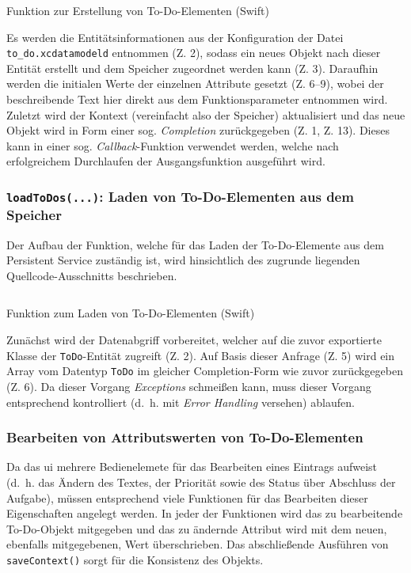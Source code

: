 \begin{listing}[H]
	\inputminted{Swift}{sourcecode/ios_createToDo.swift}	
	\caption{Funktion zur Erstellung von To-Do-Elementen (Swift)}
\end{listing}

Es werden die Entitätsinformationen aus der Konfiguration der Datei \texttt{to\_do.xcdatamodeld} entnommen (Z. 2), sodass ein neues Objekt nach dieser Entität erstellt und dem Speicher zugeordnet werden kann (Z. 3). Daraufhin werden die initialen Werte der einzelnen Attribute gesetzt (Z. 6--9), wobei der beschreibende Text hier direkt aus dem Funktionsparameter entnommen wird. Zuletzt wird der Kontext (vereinfacht also der Speicher) aktualisiert und das neue Objekt wird in Form einer sog. \textit{Completion} zurückgegeben (Z. 1, Z. 13). Dieses kann in einer sog. \textit{Callback}-Funktion verwendet werden, welche nach erfolgreichem Durchlaufen der Ausgangsfunktion ausgeführt wird.

\subsubsection{\texttt{loadToDos(...)}: Laden von To-Do-Elementen aus dem Speicher}
Der Aufbau der Funktion, welche für das Laden der To-Do-Elemente aus dem Persistent Service zuständig ist, wird hinsichtlich des zugrunde liegenden Quellcode-Ausschnitts beschrieben.

\begin{listing}[H]
	\inputminted{Swift}{sourcecode/ios_loadToDos.swift}	
	\caption{Funktion zum Laden von To-Do-Elementen (Swift)}
\end{listing}

Zunächst wird der Datenabgriff vorbereitet, welcher auf die zuvor exportierte Klasse der \texttt{ToDo}-Entität zugreift (Z. 2). Auf Basis dieser Anfrage (Z. 5) wird ein Array vom Datentyp \texttt{ToDo} im gleicher Completion-Form wie zuvor zurückgegeben (Z. 6). Da dieser Vorgang \textit{Exceptions} schmeißen kann, muss dieser Vorgang entsprechend kontrolliert (d.\ h. mit \textit{Error Handling} versehen) ablaufen.

\subsubsection{Bearbeiten von Attributswerten von To-Do-Elementen}
Da das \ac{ui} mehrere Bedienelemete für das Bearbeiten eines Eintrags aufweist (d.\ h. das Ändern des Textes, der Priorität sowie des Status über Abschluss der Aufgabe), müssen entsprechend viele Funktionen für das Bearbeiten dieser Eigenschaften angelegt werden. In jeder der Funktionen wird das zu bearbeitende To-Do-Objekt mitgegeben und das zu ändernde Attribut wird mit dem neuen, ebenfalls mitgegebenen, Wert überschrieben. Das abschließende Ausführen von \texttt{saveContext()} sorgt für die Konsistenz des Objekts.

